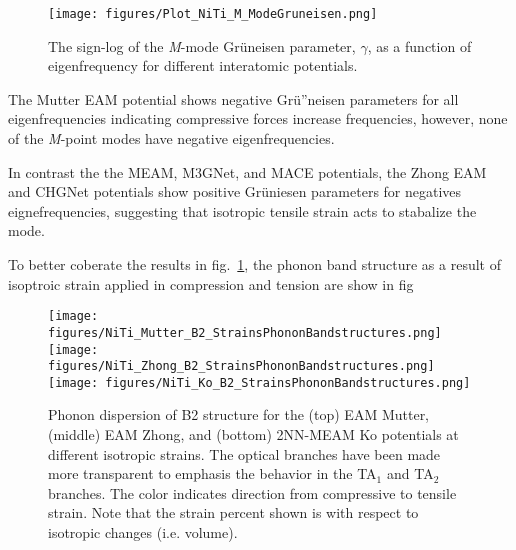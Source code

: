 \documentclass[preprint,colorlinks=true,linkcolor=black,citecolor=black]{elsarticle}
\begin{document}
\begin{figure}[!htp]
	\centering
	\texttt{[image: figures/Plot\_NiTi\_M\_ModeGruneisen.png]}
	\caption{The sign-log of the \textit{M}-mode Gr\"{u}neisen
	parameter, $\gamma$, as a function of eigenfrequency for different
	interatomic potentials.}
	\label{fig:modegruneisen}
\end{figure}

The Mutter EAM potential shows negative Gr\"{u}''neisen parameters for
all eigenfrequencies indicating compressive forces increase
frequencies, however, none of the \textit{M}-point modes have negative
eigenfrequencies. \par

In contrast the the MEAM, M3GNet, and MACE potentials, the Zhong EAM
and CHGNet potentials show positive Gr\"{u}niesen parameters for
negatives eignefrequencies, suggesting that isotropic tensile strain
acts to stabalize the mode. \par

To better coberate the results in fig.~\ref{fig:modegruneisen}, the
phonon band structure as a result of isoptroic strain applied in
compression and tension are show in fig

\begin{figure}[!htp]
	\begin{centering}
		\texttt{[image: figures/NiTi\_Mutter\_B2\_StrainsPhononBandstructures.png]} \vspace{1mm}
		\texttt{[image: figures/NiTi\_Zhong\_B2\_StrainsPhononBandstructures.png]} \vspace{1mm}
		\texttt{[image: figures/NiTi\_Ko\_B2\_StrainsPhononBandstructures.png]}
		\caption{ Phonon dispersion of B2 structure for the (top) EAM
			Mutter, (middle) EAM Zhong, and (bottom) 2NN-MEAM Ko potentials
			at different isotropic strains. The optical branches have been
			made more transparent to emphasis the behavior in the TA$_1$ and
			TA$_2$ branches. The color indicates direction from compressive
			to tensile strain. Note that the strain percent shown is with
			respect to isotropic changes (i.e. volume).  }
		\label{fig:mutter_zhong_ko_phonon_b2}
	\end{centering}
\end{figure}

\end{document}
